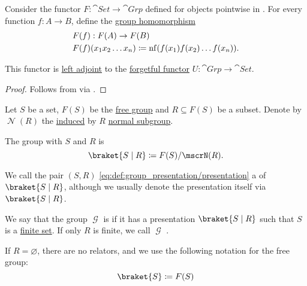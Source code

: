 \begin{corollary}\label{thm:free_monoid_functor}
  Consider the functor \( F: \cat{Set} \to \cat{Grp} \) defined for objects pointwise in . For every function \( f: A \to B \), define the \hyperref[def:group/homomorphism]{group homomorphism}
  \begin{equation*}
    \begin{aligned}
      &F(f): F(A) \to F(B) \\
      &F(f)(x_1 x_2 \ldots x_n) \coloneqq \operatorname{nf}(f(x_1) f(x_2) \ldots f(x_n)).
    \end{aligned}
  \end{equation*}

  This functor is \hyperref[def:category_adjunction]{left adjoint} to the \hyperref[def:concrete_category]{forgetful functor} \( U: \cat{Grp} \to \cat{Set} \).
\end{corollary}
\begin{proof}
  Follows from  via .
\end{proof}

\begin{definition}\label{def:group_presentation}
  Let \( S \) be a set, \( F(S) \) be the \hyperref[def:free_group]{free group} and \( R \subseteq F(S) \) be a subset. Denote by \( \mscrN(R) \) the \hyperref[def:first_order_generated_substructure]{induced} by \( R \) \hyperref[def:normal_subgroup]{normal subgroup}.

  The group with  \( S \) and  \( R \) is
  \begin{equation}\label{eq:def:group_presentation/presentation}
    \braket{ S \mid R } \coloneqq F(S) / \mscrN(R).
  \end{equation}

  We call the pair \( (S, R) \) \eqref{eq:def:group_presentation/presentation} a  of \( \braket{ S \mid R } \), although we usually denote the presentation itself via \( \braket{ S \mid R } \).

  We say that the group \( \mscrG \) is  if it has a presentation \( \braket{ S \mid R } \) such that \( S \) is a \hyperref[def:set_finiteness]{finite set}. If only \( R \) is finite, we call \( \mscrG \) .

  If \( R = \varnothing \), there are no relators, and we use the following notation for the free group:
  \begin{equation}\label{eq:def:group_presentation/free}
    \braket{ S } \coloneqq F(S)
  \end{equation}
\end{definition}

